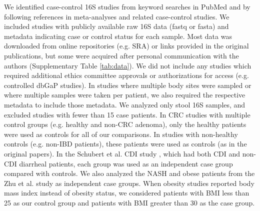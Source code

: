 We identified case-control 16S studies from keyword searches in PubMed and by following references in meta-analyses and related case-control studies.
We included studies with publicly available raw 16S data (fastq or fasta) and metadata indicating case or control status for each sample.
Most data was downloaded from online repositories (e.g. SRA) or links provided in the original publications, but some were acquired after personal communication with the authors (Supplementary Table \ref{tab:data}).
We did not include any studies which required additional ethics committee approvals or authorizations for access (e.g. controlled dbGaP studies).
In studies where multiple body sites were sampled or where multiple samples were taken per patient, we also required the respective metadata to include those metadata.
We analyzed only stool 16S samples, and excluded studies with fewer than 15 case patients.
In CRC studies with multiple control groups (e.g. healthy and non-CRC adenoma), only the healthy patients were used as controls for all of our comparisons.
In studies with non-healthy controls (e.g. non-IBD patients), these patients were used as controls (as in the original papers).
In the Schubert et al. CDI study \cite{cdi-schubert}, which had both CDI and non-CDI diarrheal patients, each group was used as an independent case group compared with controls.
We also analyzed the NASH and obese patients from the Zhu et al. study \cite{nash-baker} as independent case groups.
When obesity studies reported body mass index instead of obesity status, we considered patients with BMI less than 25 as our control group and patients with BMI greater than 30 as the case group.

